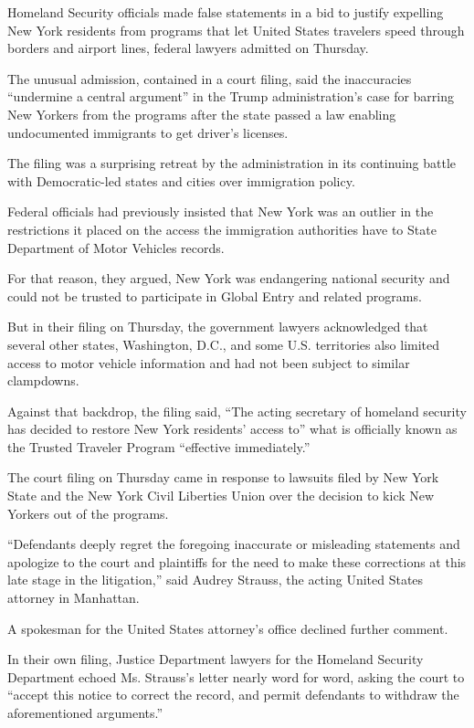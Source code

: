 Homeland Security officials made false statements in a bid to justify
expelling New York residents from programs that let United States
travelers speed through borders and airport lines, federal lawyers
admitted on Thursday.

The unusual admission, contained in a court filing, said the
inaccuracies ``undermine a central argument'' in the Trump
administration's case for barring New Yorkers from the programs after
the state passed a law enabling undocumented immigrants to get driver's
licenses.

The filing was a surprising retreat by the administration in its
continuing battle with Democratic-led states and cities over immigration
policy.

Federal officials had previously insisted that New York was an outlier
in the restrictions it placed on the access the immigration authorities
have to State Department of Motor Vehicles records.

For that reason, they argued, New York was endangering national security
and could not be trusted to participate in Global Entry and related
programs.

But in their filing on Thursday, the government lawyers acknowledged
that several other states, Washington, D.C., and some U.S. territories
also limited access to motor vehicle information and had not been
subject to similar clampdowns.

Against that backdrop, the filing said, ``The acting secretary of
homeland security has decided to restore New York residents' access to''
what is officially known as the Trusted Traveler Program ``effective
immediately.''

The court filing on Thursday came in response to lawsuits filed by New
York State and the New York Civil Liberties Union over the decision to
kick New Yorkers out of the programs.

``Defendants deeply regret the foregoing inaccurate or misleading
statements and apologize to the court and plaintiffs for the need to
make these corrections at this late stage in the litigation,'' said
Audrey Strauss, the acting United States attorney in Manhattan.

A spokesman for the United States attorney's office declined further
comment.

In their own filing, Justice Department lawyers for the Homeland
Security Department echoed Ms. Strauss's letter nearly word for word,
asking the court to ``accept this notice to correct the record, and
permit defendants to withdraw the aforementioned arguments.''

